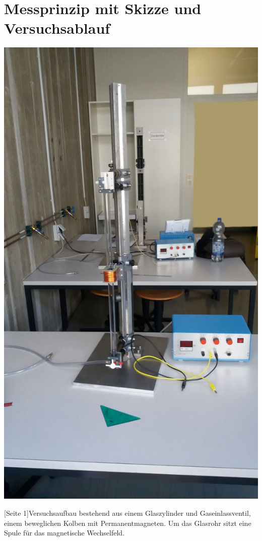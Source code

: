 \documentclass[12pt,a4paper,]{scrreprt}
\begin{document}
\chapter{Messprinzip mit Skizze und Versuchsablauf}
\begin{center}
    		\includegraphics[scale=0.2]{Daten/aufbau.jpeg}
    	\end{center}
    	[Seite 1]{Versuchsaufbau bestehend aus einem Glaszylinder und Gaseinlassventil, einem beweglichen Kolben mit Permanentmagneten. Um das Glasrohr sitzt eine Spule  für das magnetische Wechselfeld.}
\end{document}
